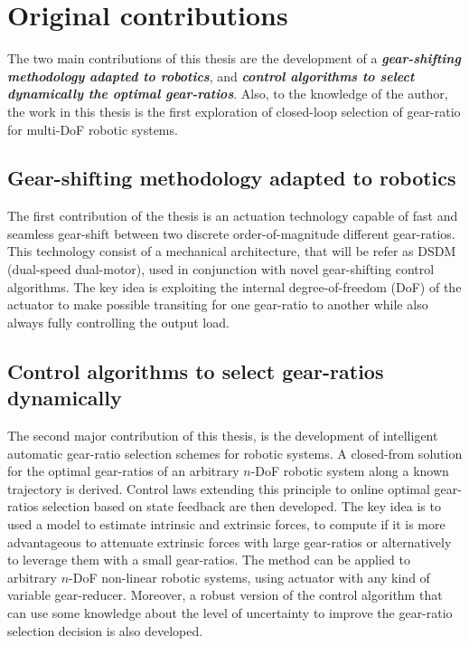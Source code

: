 \section{Original contributions}
\label{sec:contribution}

The two main contributions of this thesis are the development of a \emph{\textbf{gear-shifting methodology adapted to robotics}}, and \emph{\textbf{control algorithms to select dynamically the optimal gear-ratios}}. Also, to the knowledge of the author, the work in this thesis is the first exploration of closed-loop selection of gear-ratio for multi-DoF robotic systems. 


\subsection{Gear-shifting methodology adapted to robotics}

The first contribution of the thesis is an actuation technology capable of fast and seamless gear-shift between two discrete order-of-magnitude different gear-ratios. This technology consist of a mechanical architecture, that will be refer as DSDM (dual-speed dual-motor), used in conjunction with novel gear-shifting control algorithms. The key idea is exploiting the internal degree-of-freedom (DoF) of the actuator to make possible transiting for one gear-ratio to another while also always fully controlling the output load. 

\subsection{Control algorithms to select gear-ratios dynamically}

The second major contribution of this thesis, is the development of intelligent automatic gear-ratio selection schemes for robotic systems. A closed-from solution for the optimal gear-ratios of an arbitrary $n$-DoF robotic system along a known trajectory is derived. Control laws extending this principle to online optimal gear-ratios selection based on state feedback are then developed. The key idea is to used a model to estimate intrinsic and extrinsic forces, to compute if it is more advantageous to attenuate extrinsic forces with large gear-ratios or alternatively to leverage them with a small gear-ratios. The method can be applied to arbitrary $n$-DoF non-linear robotic systems, using actuator with any kind of variable gear-reducer. Moreover, a robust version of the control algorithm that can use some knowledge about the level of uncertainty to improve the gear-ratio selection decision is also developed.


